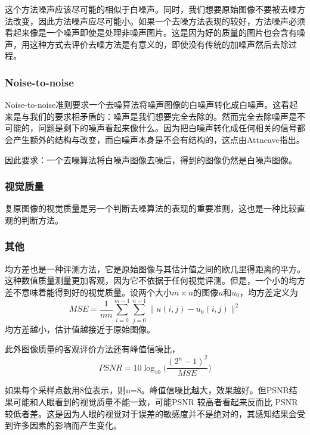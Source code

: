 \documentclass[a4paper,12pt]{article}
\begin{document}
这个方法噪声应该尽可能的相似于白噪声。同时，我们想要原始图像不要被去噪方法改变，因此方法噪声应尽可能小。如果一个去噪方法表现的较好，方法噪声必须看起来像是一个噪声即使是处理非噪声图片。这是因为好的质量的图片也会含有噪声，用这种方式去评价去噪方法是有意义的\cite{buades2005non}，即使没有传统的加噪声然后去除过程。

\subsubsection{Noise-to-noise}
Noise-to-noise准则\cite{buades2008nonlocal}要求一个去噪算法将噪声图像的白噪声转化成白噪声。这看起来是与我们的要求相矛盾的：噪声是我们想要完全去除的。然而完全去除噪声是不可能的，问题是剩下的噪声看起来像什么。因为把白噪声转化成任何相关的信号都会产生额外的结构与改变，而白噪声本身是不会有结构的，这点由Attneave\cite{attneave1954some}指出。

因此要求：一个去噪算法将白噪声图像去噪后，得到的图像仍然是白噪声图像。
\subsubsection{视觉质量}
复原图像的视觉质量是另一个判断去噪算法的表现的重要准则，这也是一种比较直观的判断方法。

\subsubsection{其他}
均方差也是一种评测方法，它是原始图像与其估计值之间的欧几里得距离的平方。这种数值质量测量更加客观，因为它不依据于任何视觉评测。但是，一个小的均方差不意味着能得到好的视觉质量。设两个大小$m\times n$的图像$u$和$u_0$，均方差定义为
\begin{displaymath}
MSE=\frac{1}{mn}\sum_{i=0}^{m-1}\sum_{j=0}^{n-1}\|u(i,j)-u_0(i,j)\|^2
\end{displaymath}
均方差越小，估计值越接近于原始图像。

此外图像质量的客观评价方法还有峰值信噪比，
\begin{displaymath}
PSNR=10\log_{10}\bigg(\frac{(2^n-1)^2}{MSE}\bigg)
\end{displaymath}

如果每个采样点数用8位表示，则n=8。峰值信噪比越大，效果越好。但PSNR结果可能和人眼看到的视觉质量不能一致，可能PSNR 较高者看起来反而比 PSNR 较低者差。这是因为人眼的视觉对于误差的敏感度并不是绝对的，其感知结果会受到许多因素的影响而产生变化。
\end{document}
